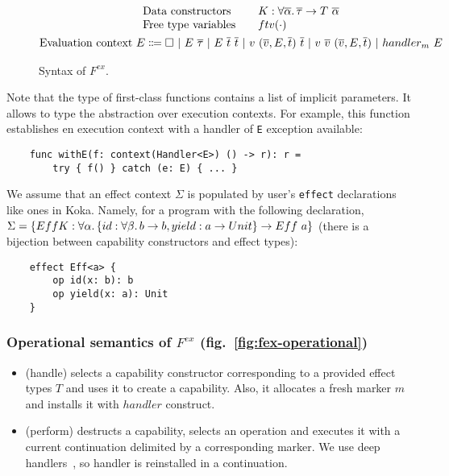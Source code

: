 \documentclass[acmsmall]{acmart}
\newcommand{\vor}{~|~}
\newcommand{\ap}{~}
\begin{document}
\begin{figure}
\begin{gather*}
\begin{array}{lrl}
            \text{Data constructors} & & K : \forall\overline{\alpha}\ldotp \overline{\tau}\to T\ap \overline{\alpha} \\
            \text{Free type variables} & & ftv(\cdot) \\
        \end{array}\\
        \begin{aligned}
            \text{Evaluation context } E \Coloneqq \square \vor E \ap \overline{\tau} \vor E \ap \overline{t}\ap \overline{t} \vor v \ap (\overline{v}, E, \overline{t}) \ap \overline{t} \vor v \ap \overline{v} \ap (\overline{v}, E, \overline{t}) \vor handler_m ~ E
        \end{aligned}\\
    \end{gather*}
    \caption{Syntax of $F^{ex}$.}
    \label{fig:core-syntax}
\end{figure}

Note that the type of first-class functions contains a list of implicit parameters.
It allows to type the abstraction over execution contexts. %
For example, this function establishes en execution context with a handler of \texttt{E} exception available:
\begin{verbatim}
    func withE(f: context(Handler<E>) () -> r): r =
        try { f() } catch (e: E) { ... }
\end{verbatim}

We assume that an effect context $\Sigma$ is populated by user's \texttt{effect} declarations like ones in Koka. %
Namely, for a program with the following declaration, $\Sigma = \{EffK : \forall\alpha\ldotp\{id : \forall\beta\ldotp b\to b, yield : a \to Unit\} \to Eff\ap a\}$ (there is a bijection between capability constructors and effect types):
\begin{verbatim}
    effect Eff<a> {
        op id(x: b): b
        op yield(x: a): Unit
    }
\end{verbatim}


\subsubsection{Operational semantics of $F^{ex}$ (fig.\ \ref{fig:fex-operational})}

\begin{itemize}
    \item (handle) selects a capability constructor corresponding to a provided effect types $T$ and uses it to create a capability.
    Also, it allocates a fresh marker $m$ and installs it with $handler$ construct.
    \item (perform) destructs a capability, selects an operation and executes it with a current continuation delimited by a corresponding marker.
    We use deep handlers~\cite{hillerstrom2018shallow}, so handler is reinstalled in a continuation.
\end{itemize}
\end{document}
